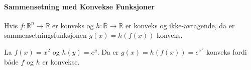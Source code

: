 \paragraph{Sammensetning med Konvekse Funksjoner}
Hvis \( f: \mathbb{R}^n \to \mathbb{R} \) er konveks og \( h: \mathbb{R} \to \mathbb{R} \) er konveks og ikke-avtagende, da er sammensetningsfunksjonen \( g(x) = h(f(x)) \) konveks.

\begin{example}{}{}
	La \( f(x) = x^2 \) og \( h(y) = e^y \). Da er \( g(x) = h(f(x)) = e^{x^2} \) konveks fordi både \( f \) og \( h \) er konvekse.
	\begin{center}
	\end{center}
\end{example}

